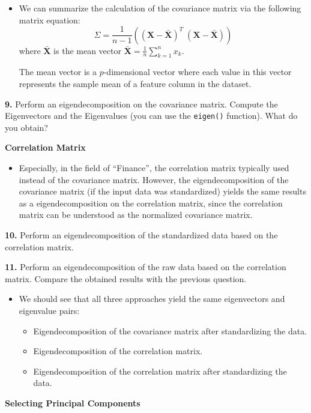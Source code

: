\documentclass[]{book}
\providecommand{\tightlist}{%
  \setlength{\itemsep}{0pt}\setlength{\parskip}{0pt}}
\newenvironment{rmdblock}[1]
  {\begin{shaded*}
  \begin{itemize}
  \renewcommand{\labelitemi}{
    \raisebox{-.7\height}[0pt][0pt]{
      {\setkeys{Gin}{width=2em,keepaspectratio}\texttt{[image: img/icons/\#1]}}
    }
  }
  \item
  }
  {
  \end{itemize}
  \end{shaded*}
  }
\newenvironment{rmdinsight}
  {\begin{rmdblock}{insight}}
  {\end{rmdblock}}
\newenvironment{rmdtip}
  {\begin{rmdblock}{tip}}
  {\end{rmdblock}}
\theoremstyle{definition}
\theoremstyle{definition}
\theoremstyle{definition}
\theoremstyle{remark}
\begin{document}
\begin{rmdtip}
We can summarize the calculation of the covariance matrix via the
following matrix equation:
\[ \Sigma = \frac{1}{n-1} \left( (\mathbf{X} - \mathbf{\bar{X}})^T\;(\mathbf{X} - \mathbf{\bar{X}}) \right) \]
where \(\mathbf{\bar{X}}\) is the mean vector
\(\mathbf{\bar{X}} = \frac{1}{n} \sum\limits_{k=1}^n x_{k}\).

The mean vector is a \(p\)-dimensional vector where each value in this
vector represents the sample mean of a feature column in the dataset.
\end{rmdtip}

\textbf{9.} Perform an eigendecomposition on the covariance matrix.
Compute the Eigenvectors and the Eigenvalues (you can use the
\texttt{eigen()} function). What do you obtain?

\textbf{Correlation Matrix}

\begin{rmdinsight}
Especially, in the field of ``Finance'', the correlation matrix
typically used instead of the covariance matrix. However, the
eigendecomposition of the covariance matrix (if the input data was
standardized) yields the same results as a eigendecomposition on the
correlation matrix, since the correlation matrix can be understood as
the normalized covariance matrix.
\end{rmdinsight}

\textbf{10.} Perform an eigendecomposition of the standardized data
based on the correlation matrix.

\textbf{11.} Perform an eigendecomposition of the raw data based on the
correlation matrix. Compare the obtained results with the previous
question.

\begin{rmdinsight}
We should see that all three approaches yield the same eigenvectors and
eigenvalue pairs:

\begin{itemize}
\tightlist
\item
  Eigendecomposition of the covariance matrix after standardizing the
  data.
\item
  Eigendecomposition of the correlation matrix.
\item
  Eigendecomposition of the correlation matrix after standardizing the
  data.
\end{itemize}
\end{rmdinsight}

\textbf{Selecting Principal Components}
\end{document}
